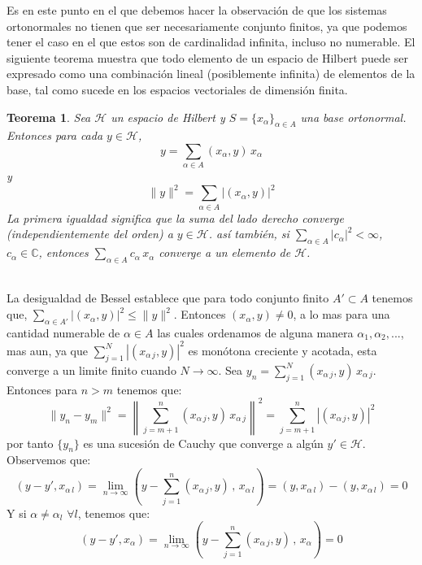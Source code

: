 \documentclass[12pt]{book}
\numberwithin{equation}{chapter}
\newtheorem{theorem}{Teorema}[chapter]
\def\n{\noindent}
\def\C{\mathbb{C}}
\def\rar{\rightarrow}
\def\H{\mathcal{H}}
\begin{document}
\vspace{5 mm}

Es en este punto en el que debemos hacer la observaci\'on de que los sistemas ortonormales no tienen que ser necesariamente conjunto finitos, ya que podemos tener el caso en el que estos son de cardinalidad infinita, incluso no numerable. El siguiente teorema muestra que todo elemento de un espacio de Hilbert puede ser expresado como una combinaci\'on lineal (posiblemente infinita) de elementos de la base, tal como sucede en los espacios vectoriales de dimensi\'on finita.

\vspace{5 mm}

\begin{theorem}\label{bas-exp}
Sea $\H$ un espacio de Hilbert y $S=\{x_{\alpha}\}_{\alpha \in A}$ una base ortonormal. Entonces para cada $y \in \H$,
$$ y = \sum_{\alpha \in A} (x_{\alpha},y)\, x_{\alpha} $$
y 
$$ \|y\|^{2}= \sum_{\alpha \in A} |(x_{\alpha},y)|^{2} $$
La primera igualdad significa que la suma del lado derecho converge (independientemente del orden) a $y\in\H$. as\'i tambi\'en, si $\sum_{\alpha \in A} |c_{\alpha}|^{2} < \infty$, $c_{\alpha} \in \C$, entonces $ \sum_{\alpha \in A} c_{\alpha}\, x_{\alpha} $ converge a un elemento de $\H$.

\end{theorem}  
\n {\bf Demostraci\'on}\\
La desigualdad de Bessel establece que para todo conjunto finito $A' \subset A$ tenemos que, $ \sum_{\alpha \in A'} |(x_{\alpha},y)|^{2} \leq \|y\|^{2} $. Entonces $(x_{\alpha},y) \neq 0$, a lo mas para una cantidad numerable de $\alpha \in A$ las cuales ordenamos de alguna manera $ \alpha_{1},\alpha_{2},... $, mas aun, ya que $\sum_{j=1}^{N} |(x_{\alpha\,j},y)|^{2} $ es mon\'otona creciente y acotada, esta converge a un limite finito cuando $ N \rar \infty $. Sea $y_{n} = \sum_{j=1}^{N} (x_{\alpha\,j},y)\,x_{\alpha\,j} $. Entonces para $n>m$ tenemos que:
$$ \| y_{n}-y_{m} \|^{2} = \left\| \sum_{j=m+1}^{n} (x_{\alpha\,j},y)\,x_{\alpha\,j} \right\|^{2} = \sum_{j=m+1}^{n} |(x_{\alpha\,j},y)|^{2} $$
por tanto $\{ y_{n} \}$ es una sucesi\'on de Cauchy que converge a alg\'un $y' \in \H$.\\
Observemos que:
$$ ( y-y' , x_{\alpha\,l})= \lim_{n \rar \infty} \left(y - \sum_{j=1}^{n} (x_{\alpha\,j},y) \,,\, x_{\alpha\,l}  \right)= (y,x_{\alpha\,l}) - (y,x_{\alpha\,l})=0 $$
Y si $\alpha \neq \alpha_{l}$ $\forall l$, tenemos que:
$$ ( y-y' , x_{\alpha})= \lim_{n \rar \infty} \left(y - \sum_{j=1}^{n} (x_{\alpha\,j},y) \,,\, x_{\alpha}  \right)= 0$$
\end{document}
